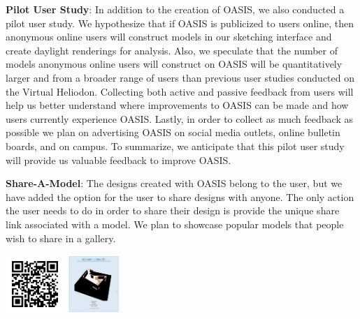 \documentclass[landscape,final,a0paper,fontscale=0.285]{baposter}
\begin{document}
\begin{poster}
{\begin{multicols}{2}
	
	\textbf{Pilot User Study}: In addition to the creation of OASIS, we also conducted a pilot user study. 
	We hypothesize that if OASIS is publicized to users online, then anonymous online users will construct models in our sketching interface and create daylight renderings for analysis.
	Also, we speculate that the number of models anonymous online users will construct on OASIS will be quantitatively larger and from a broader range of users than previous user studies conducted on the Virtual Heliodon.
	Collecting both active and passive feedback from users will help us better understand where improvements to OASIS can be made and how users currently experience OASIS.
	Lastly, in order to collect as much feedback as possible we plan on advertising OASIS on social media outlets, online bulletin boards, and on campus.
	To summarize, we anticipate  that this pilot user study will provide us valuable feedback to improve OASIS.
	

	 
	\textbf{Share-A-Model}: The designs created with OASIS belong to the user, but we have added the option for the user to share designs with anyone. The only action the user needs to do in order to share their design is provide the unique share link associated with a model. We plan to showcase popular models that people wish to share in a gallery. 
	
	
	\begin{center}\includegraphics[height=6em]{img/videoqr.jpg}	
	\includegraphics[height=6em]{img/nab.png}	
	\end{center}	
	
	
	
	   
 \end{multicols}
}


\end{poster}
\end{document}
